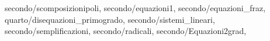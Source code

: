 secondo/scomposizionipoli,
  secondo/equazioni1,
  secondo/equazioni_fraz,
  quarto/disequazioni_primogrado,
 secondo/sistemi_lineari,
	secondo/semplificazioni,
	secondo/radicali,
	secondo/Equazioni2grad,